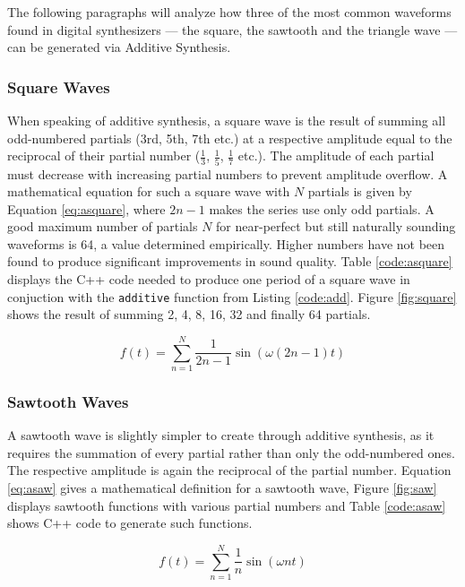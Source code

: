 The following paragraphs will analyze how three of the most common waveforms found in digital synthesizers --- the square, the sawtooth and the triangle wave --- can be generated via Additive Synthesis.

\subsubsection{Square Waves}

When speaking of additive synthesis, a square wave is the result of summing all odd-numbered partials (3rd, 5th, 7th etc.) at a respective amplitude equal to the reciprocal of their partial number ($\frac{1}{3}$, $\frac{1}{5}$, $\frac{1}{7}$ etc.). The amplitude of each partial must decrease with increasing partial numbers to prevent amplitude overflow. A mathematical equation for such a square wave with $N$ partials is given by Equation \ref{eq:asquare}, where $2n - 1$ makes the series use only odd partials. A good maximum number of partials $N$ for near-perfect but still naturally sounding waveforms is 64, a value determined empirically. Higher numbers have not been found to produce significant improvements in sound quality. Table \ref{code:asquare} displays the C++ code needed to produce one period of a square wave in conjuction with the \texttt{additive} function from Listing \ref{code:add}. Figure \ref{fig:square} shows the result of summing 2, 4, 8, 16, 32 and finally 64 partials.

\begin{equation}
  f(t) = \sum\limits_{n=1}^N \frac{1}{2n -1} \sin(\omega (2n - 1) t)
  \label{eq:asquare}
\end{equation}

\subsubsection{Sawtooth Waves}

A sawtooth wave is slightly simpler to create through additive synthesis, as it requires the summation of every partial rather than only the odd-numbered ones. The respective amplitude is again the reciprocal of the partial number. Equation \ref{eq:asaw} gives a mathematical definition for a sawtooth wave, Figure \ref{fig:saw} displays sawtooth functions with various partial numbers and Table \ref{code:asaw} shows C++ code to generate such functions.

\begin{equation}
  f(t) = \sum\limits_{n=1}^N \frac{1}{n} \sin(\omega n t)
  \label{eq:asaw}
\end{equation}

